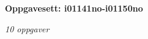 \centerline{\bf Oppgavesett: i01141no-i01150no}
\vskip 10pt
\centerline{\it 10 oppgaver}\vskip 10pt
\vskip 10pt
